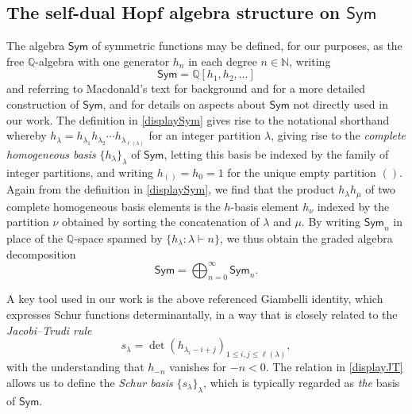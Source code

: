 \documentclass[12pt]{article}
\begin{document}
\subsection{The self-dual Hopf algebra structure on $\textsf{Sym}$}
 The algebra $\textsf{Sym}$ of symmetric functions may be defined, for our purposes, as the free $\mathbb{Q}$-algebra with one 
 generator $h_{n}$ in each degree $n \in \mathbb{N}$, writing 
\begin{equation}\label{displaySym}
 \textsf{Sym} = \mathbb{Q}[h_1, h_2, \ldots] 
\end{equation}
 and referring to Macdonald's text for background \cite{Macdonald1995} and 
 for a more detailed construction of $\textsf{Sym}$, and for 
 details on aspects about $\textsf{Sym}$ not directly used in our work. The definition in \eqref{displaySym} gives rise to the notational 
 shorthand whereby $h_{\lambda} = h_{\lambda_{1}} h_{\lambda_{2}} \cdots h_{\lambda_{\ell(\lambda)}}$ for an integer partition 
 $\lambda$, giving rise to the \emph{complete homogeneous basis} $\{ h_{\lambda} \}_{\lambda}$ of $\textsf{Sym}$, letting this basis 
 be indexed by the family of integer partitions, and writing $h_{()} = h_{0} = 1$ for the unique empty partition $()$. Again from the 
 definition in \eqref{displaySym}, we find that the product $h_{\lambda} h_{\mu}$ of two complete homogeneous basis elements is 
 the $h$-basis element $h_{\nu}$ indexed by the partition $\nu$ obtained by sorting the concatenation of $\lambda$ and $\mu$. By 
 writing $\textsf{Sym}_{n}$ in place of the $\mathbb{Q}$-space spanned by $\{ h_{\lambda} : \lambda \vdash n \}$, we thus obtain the 
 graded algebra decomposition 
\begin{equation}\label{Symgraded}
 \textsf{Sym} = \bigoplus_{n=0}^{\infty} \textsf{Sym}_{n}. 
\end{equation}

 A key tool used in our work is the above referenced Giambelli identity, which expresses Schur functions determinantally, in a way that is 
 closely related to the \emph{Jacobi--Trudi rule} 
\begin{equation}\label{displayJT}
 s_{\lambda} = \det\left( h_{\lambda_i - i +j} \right)_{1 \leq i, j \leq \ell(\lambda)}, 
\end{equation}
 with the understanding that $h_{-n}$ vanishes for $-n < 0$. The relation in \eqref{displayJT} allows us to define the \emph{Schur basis}
 $\{ s_{\lambda} \}_{\lambda}$, which is typically regarded as \emph{the} basis of $\textsf{Sym}$. 
\end{document}
